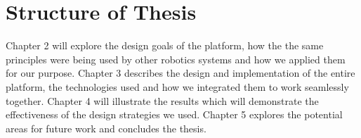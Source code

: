 \section{Structure of Thesis}
Chapter 2 will explore the design goals of the \xten platform, how the the same principles were being used by other robotics systems and how we applied them for our purpose. 
Chapter 3 describes the design and implementation of the entire platform, the technologies used and how we integrated them to work seamlessly together.
Chapter 4 will illustrate the results which will demonstrate the effectiveness of the design strategies we used.
Chapter 5 explores the potential areas for future work and concludes the thesis.

